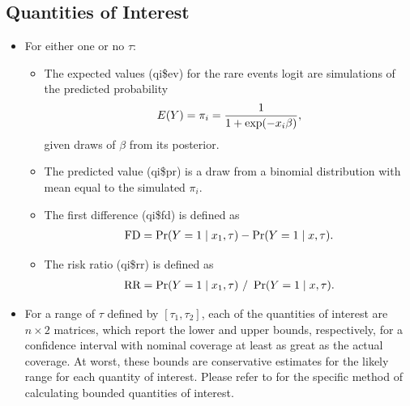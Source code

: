 \documentclass[letterpaper,10pt,english]{sphinxmanual}
\begin{document}
\subsection{Quantities of Interest}
\label{vignette:id54}\begin{itemize}
\item {} 
For either one or no \(\tau\):
\begin{itemize}
\item {} 
The expected values (qi\$ev) for the rare events logit are
simulations of the predicted probability
\begin{gather}
\begin{split}E(Y) = \pi_i =
    \frac{1}{1 + \exp(-x_i \beta)},\end{split}\notag
\end{gather}
given draws of \(\beta\) from its posterior.

\item {} 
The predicted value (qi\$pr) is a draw from a binomial distribution
with mean equal to the simulated \(\pi_i\).

\item {} 
The first difference (qi\$fd) is defined as
\begin{gather}
\begin{split}\textrm{FD} = \Pr(Y = 1 \mid x_1, \tau) - \Pr(Y = 1 \mid x, \tau).\end{split}\notag
\end{gather}
\item {} 
The risk ratio (qi\$rr) is defined as
\begin{gather}
\begin{split}\textrm{RR} = \Pr(Y = 1 \mid x_1, \tau) \ / \ \Pr(Y = 1 \mid x, \tau).\end{split}\notag
\end{gather}
\end{itemize}

\item {} 
For a range of \(\tau\) defined by \([\tau_1, \tau_2]\), each
of the quantities of interest are \(n \times 2\) matrices, which
report the lower and upper bounds, respectively, for a confidence
interval with nominal coverage at least as great as the actual
coverage. At worst, these bounds are conservative estimates for the
likely range for each quantity of interest. Please refer to for the
specific method of calculating bounded quantities of interest.


\end{itemize}
\end{document}
